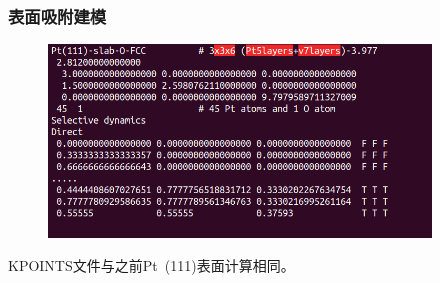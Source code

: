 {
	\frametitle{表面吸附建模}
\begin{figure}[h!]
\vskip -5pt
\centering
\includegraphics[width=4.0in,viewport=0 10 520 280,clip]{Figures/Pt_surface-adsorption-POSCAR.png}
\caption{\fontsize{6.2pt}{5.2pt}}%
\label{Pt_surface-adsorption-POSCAR}
\end{figure}
{\fontsize{7.0pt}{5.2pt}}

\textrm{KPOINTS}文件与之前\textrm{Pt~(111)}表面计算相同。
}

